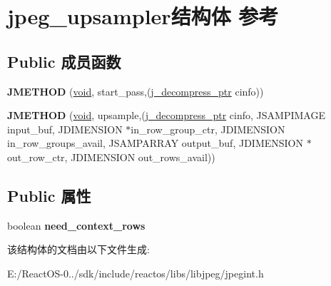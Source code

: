 \hypertarget{structjpeg__upsampler}{}\section{jpeg\+\_\+upsampler结构体 参考}
\label{structjpeg__upsampler}
\subsection*{Public 成员函数}
\begin{DoxyCompactItemize}
\item 
\mbox{\label{structjpeg__upsampler_a01ac725bfe78e05e7671547504a95346}} 
{\bfseries J\+M\+E\+T\+H\+OD} (\hyperlink{interfacevoid}{void}, start\+\_\+pass,(\hyperlink{structjpeg__decompress__struct}{j\+\_\+decompress\+\_\+ptr} cinfo))
\item 
\mbox{\label{structjpeg__upsampler_a23e9af5ee7259d39179063e3ece9fb8f}} 
{\bfseries J\+M\+E\+T\+H\+OD} (\hyperlink{interfacevoid}{void}, upsample,(\hyperlink{structjpeg__decompress__struct}{j\+\_\+decompress\+\_\+ptr} cinfo, J\+S\+A\+M\+P\+I\+M\+A\+GE input\+\_\+buf, J\+D\+I\+M\+E\+N\+S\+I\+ON $\ast$in\+\_\+row\+\_\+group\+\_\+ctr, J\+D\+I\+M\+E\+N\+S\+I\+ON in\+\_\+row\+\_\+groups\+\_\+avail, J\+S\+A\+M\+P\+A\+R\+R\+AY output\+\_\+buf, J\+D\+I\+M\+E\+N\+S\+I\+ON $\ast$out\+\_\+row\+\_\+ctr, J\+D\+I\+M\+E\+N\+S\+I\+ON out\+\_\+rows\+\_\+avail))
\end{DoxyCompactItemize}
\subsection*{Public 属性}
\begin{DoxyCompactItemize}
\item 
\mbox{\label{structjpeg__upsampler_af1ed2e1ca01280221b9c1305fc557e45}} 
boolean {\bfseries need\+\_\+context\+\_\+rows}
\end{DoxyCompactItemize}


该结构体的文档由以下文件生成\+:\begin{DoxyCompactItemize}
\item 
E\+:/\+React\+O\+S-\/0../sdk/include/reactos/libs/libjpeg/jpegint.\+h\end{DoxyCompactItemize}
